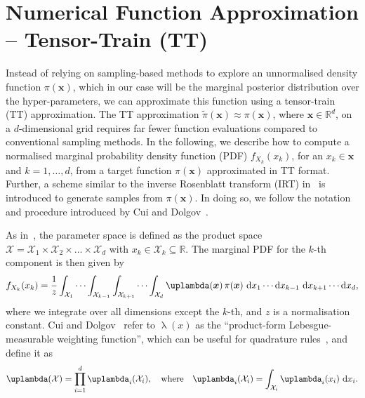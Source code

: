 \section{Numerical Function Approximation -- Tensor-Train (TT)}
\label{sec:tensortrain}
Instead of relying on sampling-based methods to explore an unnormalised density function $\pi(\bm{x})$, which in our case will be the marginal posterior distribution over the hyper-parameters, we can approximate this function using a tensor-train (TT) approximation.
The TT approximation $\tilde{\pi}(\bm{x}) \approx \pi(\bm{x})$, where $\bm{x} \in \mathbb{R}^d$, on a $d$-dimensional grid requires far fewer function evaluations compared to conventional sampling methods.
In the following, we describe how to compute a normalised marginal probability density function (PDF) $f_{X_k}(x_k)$, for an $x_k \in \bm{x}$ and $k = 1, \dots,d$, from a target function $\pi(\bm{x})$ approximated in TT format.
Further, a scheme similar to the inverse Rosenblatt transform (IRT) in~\cite{dolgov2020approximation} is introduced to generate samples from $\pi(\bm{x})$.
In doing so, we follow the notation and procedure introduced by Cui and Dolgov~\cite{cui2022deep}.


As in~\cite{cui2022deep}, the parameter space is defined as the product space $\mathcal{X} = \mathcal{X}_1 \times \mathcal{X}_2 \times \dots \times \mathcal{X}_d$ with $ x_k \in \mathcal{X}_k \subseteq \mathbb{R}$.
The marginal PDF for the $k$-th component is then given by
\begin{align}
	f_{X_k}(x_k) = \frac{1}{z} \int_{\mathcal{X}_1} \cdots \int_{\mathcal{X}_{k-1}} \int_{\mathcal{X}_{k+1}} \cdots  \int_{\mathcal{X}_d} \uplambda(\bm{x}) \, \pi(\bm{x}) \, \diff x_1 \cdots \diff x_{k-1} \, \diff x_{k+1} \cdots \diff x_d, \label{eq:margInt}
\end{align}
where we integrate over all dimensions except the $k$-th, and $z$ is a normalisation constant.
Cui and Dolgov~\cite{cui2022deep} refer to $\uplambda(x)$ as the ``product-form Lebesgue-measurable weighting function'', which can be useful for quadrature rules~\cite{davis2007methods}, and define it as
\begin{align}
	\uplambda(\mathcal{X}) = \prod_{i = 1}^{d} \uplambda_i(\mathcal{X}_i), \quad \text{where} \quad \uplambda_i(\mathcal{X}_i) = \int_{\mathcal{X}_i} \uplambda_i(x_i) \, \diff x_i. \label{eq:lebesgueWeight}
\end{align}

